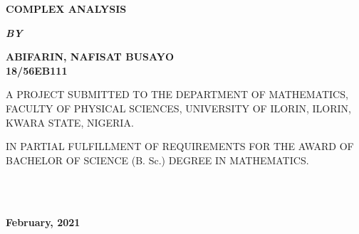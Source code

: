 \documentclass[12pt]{report}
\newcommand{\bt}[1]{\textbf{#1}}
\begin{document}
	
	\clearpage
	\thispagestyle{empty}
	\begin{center}
		\Large \bt{COMPLEX ANALYSIS}
	\end{center}

	\hspace{7cm}
	
	\begin{center}
		\textbf{\textit{BY}}
	\end{center}
	
	\hspace{5cm}
	
	\begin{center}
		\large \textbf{ABIFARIN, NAFISAT BUSAYO
			\\
			18/56EB111}
	\end{center}
	
	\hspace{9cm}
	
	\begin{center}
		A PROJECT SUBMITTED TO THE DEPARTMENT OF MATHEMATICS, FACULTY OF PHYSICAL SCIENCES, UNIVERSITY OF ILORIN, ILORIN, KWARA STATE, NIGERIA.
	\end{center}

	\hspace{7cm}
	
	\begin{center}
		IN PARTIAL FULFILLMENT OF REQUIREMENTS FOR THE AWARD OF BACHELOR OF SCIENCE (B. Sc.) DEGREE IN MATHEMATICS.
	\end{center}
	\hspace{5cm}
	\\ \\ 
	\begin{center}
		\textbf{February, 2021}
	\end{center}

	\newpage
\end{document}
